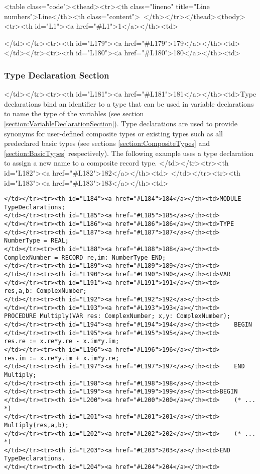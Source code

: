 <table class="code"><thead><tr><th class="lineno" title="Line numbers">Line</th><th class="content"> </th></tr></thead><tbody><tr><th id="L1"><a href="#L1">1</a></th><td>\documentclass[a4paper,11pt]{article}
\begin{document}
</td></tr><tr><th id="L179"><a href="#L179">179</a></th><td>
</td></tr><tr><th id="L180"><a href="#L180">180</a></th><td>\subsubsection{Type Declaration Section}\label{section:TypeDeclarationSection}
</td></tr><tr><th id="L181"><a href="#L181">181</a></th><td>Type declarations bind an identifier to a type that can be used in variable declarations to name the type of the variables (see section \ref{section:VariableDeclarationSection}). Type declarations are used to provide synonyms for user-defined composite types or existing types such as all predeclared basic types (see sections \ref{section:CompositeTypes} and \ref{section:BasicTypes} respectively). The following example uses a type declaration to assign a new name to a composite record type.
</td></tr><tr><th id="L182"><a href="#L182">182</a></th><td>
</td></tr><tr><th id="L183"><a href="#L183">183</a></th><td>\begin{lstlisting}[language=Oberon,frame=none,caption={Using Type Declarations}]
</td></tr><tr><th id="L184"><a href="#L184">184</a></th><td>MODULE TypeDeclarations;
</td></tr><tr><th id="L185"><a href="#L185">185</a></th><td>
</td></tr><tr><th id="L186"><a href="#L186">186</a></th><td>TYPE
</td></tr><tr><th id="L187"><a href="#L187">187</a></th><td>    NumberType = REAL;
</td></tr><tr><th id="L188"><a href="#L188">188</a></th><td>    ComplexNumber = RECORD re,im: NumberType END;
</td></tr><tr><th id="L189"><a href="#L189">189</a></th><td>
</td></tr><tr><th id="L190"><a href="#L190">190</a></th><td>VAR
</td></tr><tr><th id="L191"><a href="#L191">191</a></th><td>    res,a,b: ComplexNumber;
</td></tr><tr><th id="L192"><a href="#L192">192</a></th><td>
</td></tr><tr><th id="L193"><a href="#L193">193</a></th><td>    PROCEDURE Multiply(VAR res: ComplexNumber; x,y: ComplexNumber);
</td></tr><tr><th id="L194"><a href="#L194">194</a></th><td>    BEGIN
</td></tr><tr><th id="L195"><a href="#L195">195</a></th><td>        res.re := x.re*y.re - x.im*y.im;
</td></tr><tr><th id="L196"><a href="#L196">196</a></th><td>        res.im := x.re*y.im + x.im*y.re;
</td></tr><tr><th id="L197"><a href="#L197">197</a></th><td>    END Multiply;
</td></tr><tr><th id="L198"><a href="#L198">198</a></th><td>
</td></tr><tr><th id="L199"><a href="#L199">199</a></th><td>BEGIN
</td></tr><tr><th id="L200"><a href="#L200">200</a></th><td>    (* ... *)
</td></tr><tr><th id="L201"><a href="#L201">201</a></th><td>    Multiply(res,a,b);
</td></tr><tr><th id="L202"><a href="#L202">202</a></th><td>    (* ... *)
</td></tr><tr><th id="L203"><a href="#L203">203</a></th><td>END TypeDeclarations.
</td></tr><tr><th id="L204"><a href="#L204">204</a></th><td>\end{lstlisting}
\end{document}
